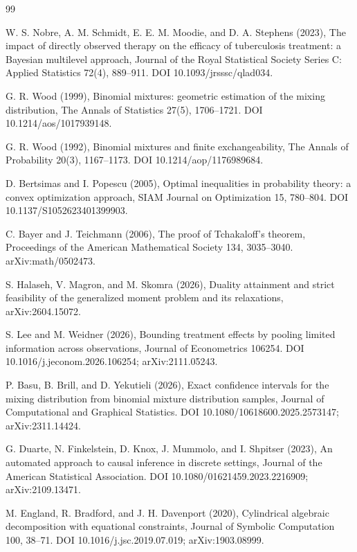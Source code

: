 \documentclass{article}
\begin{document}
\begin{thebibliography}{99}

   W. S. Nobre, A. M. Schmidt, E. E. M. Moodie, and D. A. Stephens (2023), The impact of directly observed therapy on the efficacy of tuberculosis treatment: a Bayesian multilevel approach, Journal of the Royal Statistical Society Series C: Applied Statistics 72(4), 889--911. DOI 10.1093/jrsssc/qlad034.

   G. R. Wood (1999), Binomial mixtures: geometric estimation of the mixing distribution, The Annals of Statistics 27(5), 1706--1721. DOI 10.1214/aos/1017939148.

   G. R. Wood (1992), Binomial mixtures and finite exchangeability, The Annals of Probability 20(3), 1167--1173. DOI 10.1214/aop/1176989684.

   D. Bertsimas and I. Popescu (2005), Optimal inequalities in probability theory: a convex optimization approach, SIAM Journal on Optimization 15, 780--804. DOI 10.1137/S1052623401399903.

   C. Bayer and J. Teichmann (2006), The proof of Tchakaloff's theorem, Proceedings of the American Mathematical Society 134, 3035--3040. arXiv:math/0502473.

   S. Halaseh, V. Magron, and M. Skomra (2026), Duality attainment and strict feasibility of the generalized moment problem and its relaxations, arXiv:2604.15072.

   S. Lee and M. Weidner (2026), Bounding treatment effects by pooling limited information across observations, Journal of Econometrics 106254. DOI 10.1016/j.jeconom.2026.106254; arXiv:2111.05243.

   P. Basu, B. Brill, and D. Yekutieli (2026), Exact confidence intervals for the mixing distribution from binomial mixture distribution samples, Journal of Computational and Graphical Statistics. DOI 10.1080/10618600.2025.2573147; arXiv:2311.14424.

   G. Duarte, N. Finkelstein, D. Knox, J. Mummolo, and I. Shpitser (2023), An automated approach to causal inference in discrete settings, Journal of the American Statistical Association. DOI 10.1080/01621459.2023.2216909; arXiv:2109.13471.

   M. England, R. Bradford, and J. H. Davenport (2020), Cylindrical algebraic decomposition with equational constraints, Journal of Symbolic Computation 100, 38--71. DOI 10.1016/j.jsc.2019.07.019; arXiv:1903.08999.


\end{thebibliography}
\end{document}
